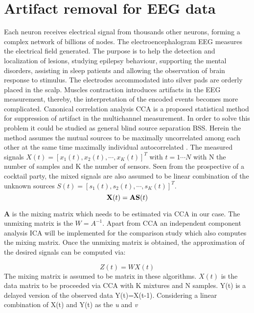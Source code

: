\section{Artifact removal for EEG data}


Each neuron receives electrical signal from thousands other neurons, forming a complex network of billions of nodes. The electroencephalogram EEG measures the electrical field generated. The purpose is to help the detection and localization of lesions,  studying epilepsy behaviour, supporting the mental disorders, assisting in sleep patients and allowing the observation of brain response to stimulus. The electrodes accommodated into silver pads are orderly placed in the scalp. Muscles contraction introduces artifacts in the EEG measurement, thereby,  the interpretation of the encoded events becomes more complicated.  Canonical correlation analysis CCA is a proposed statistical method for suppression of artifact in the multichannel measurement. In order to solve this problem it could be studied as general blind source separation BSS. Herein the method assumes the mutual sources to be maximally uncorrelated among each other at the same time maximally individual autocorrelated \cite{18}. The measured signals  $X(t)=[x_{1}(t),x_{2}(t),\cdots,x_{K}(t)]^{T}$ with $t=1\cdots N$ with N the number of samples and K the number of sensors. Seen from the prospective of a cocktail party, the mixed signals are also assumed to be linear combination of the unknown sources $S(t)=[s_{1}(t),s_{2}(t),\cdots,s_{K}(t)]^{T}$. 
\begin{equation}
    {\bf X}(t)={\bf AS}(t)
\end{equation}

\textbf{A} is the mixing matrix which needs to be estimated via CCA in our case. The unmixing matrix is the $W=A^{-1}$. Apart from CCA an independent component analysis ICA will be implemented for the comparison study which also computes the mixing matrix. Once the unmixing matrix is obtained, the approximation of the desired signals can be computed via:

\begin{equation}
    Z(t)=WX(t)
\end{equation}
The mixing matrix is assumed to be matrix in these algorithms. 
$X(t)$ is the data matrix to be proceeded via CCA with K mixtures and N samples. Y(t) is a delayed version of the observed data Y(t)=X(t-1). Considering a linear combination of X(t) and Y(t) as the \textit{u} and \textit{v} 


